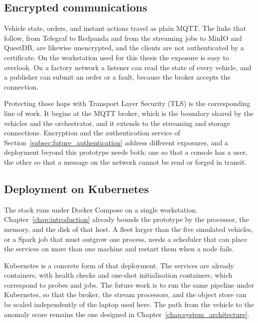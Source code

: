 \subsection{Encrypted communications}
\label{subsec:future_tls}

Vehicle state, orders, and instant actions travel as plain MQTT. The links that follow, from Telegraf to Redpanda and from the streaming jobs to MinIO and QuestDB, are likewise unencrypted, and the clients are not authenticated by a certificate. On the workstation used for this thesis the exposure is easy to overlook. On a factory network a listener can read the state of every vehicle, and a publisher can submit an order or a fault, because the broker accepts the connection.

Protecting those hops with Transport Layer Security (TLS) is the corresponding line of work. It begins at the MQTT broker, which is the boundary shared by the vehicles and the orchestrator, and it extends to the streaming and storage connections. Encryption and the authentication service of Section~\ref{subsec:future_authentication} address different exposures, and a deployment beyond this prototype needs both: one so that a console has a user, the other so that a message on the network cannot be read or forged in transit.

\subsection{Deployment on Kubernetes}
\label{subsec:future_kubernetes}

The stack runs under Docker Compose on a single workstation. Chapter~\ref{chap:introduction} already bounds the prototype by the processor, the memory, and the disk of that host. A fleet larger than the five simulated vehicles, or a Spark job that must outgrow one process, needs a scheduler that can place the services on more than one machine and restart them when a node fails.

Kubernetes is a concrete form of that deployment. The services are already containers, with health checks and one-shot initialisation containers, which correspond to probes and jobs. The future work is to run the same pipeline under Kubernetes, so that the broker, the stream processors, and the object store can be scaled independently of the laptop used here. The path from the vehicle to the anomaly score remains the one designed in Chapter~\ref{chap:system_architecture}.
